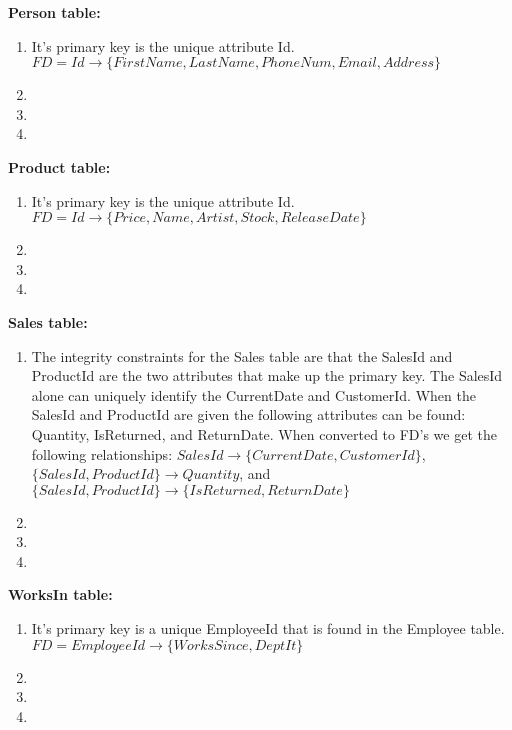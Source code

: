 \documentclass{article}
\begin{document}
  \par\textbf{Person table:}
  \begin{enumerate}[label=\roman*]
  	\item It's primary key is the unique attribute Id. \newline
    $FD = Id \rightarrow \{FirstName, LastName, PhoneNum, Email, Address\}$
  	\item
  	\item
  	\item
  \end{enumerate}
  \par\textbf{Product table:}
  \begin{enumerate}[label=\roman*]
  	\item It's primary key is the unique attribute Id. \newline
    $FD = Id \rightarrow \{Price, Name, Artist, Stock, ReleaseDate\}$
  	\item
  	\item
  	\item
  \end{enumerate}
  \par\textbf{Sales table:}
  \begin{enumerate}[label=\roman*]
  	\item The integrity constraints for the Sales table are that the SalesId and ProductId are the two attributes that make up
    the primary key. The SalesId alone can uniquely identify the CurrentDate and CustomerId. When the SalesId and ProductId are given
    the following attributes can be found: Quantity, IsReturned, and ReturnDate. When converted to FD's we get the following
    relationships: $SalesId\rightarrow\{CurrentDate,CustomerId\}$, $\{SalesId,ProductId\}\rightarrow Quantity$, and 
    $\{SalesId,ProductId\}\rightarrow\{IsReturned,ReturnDate\}$
  	\item
  	\item
  	\item
  \end{enumerate}
  \par\textbf{WorksIn table:}
  \begin{enumerate}[label=\roman*]
  	\item It's primary key is a unique EmployeeId that is found in the Employee table. \newline
    $FD = EmployeeId \rightarrow \{WorksSince, DeptIt\}$
  	\item
  	\item
  	\item
  \end{enumerate}
\end{document}
